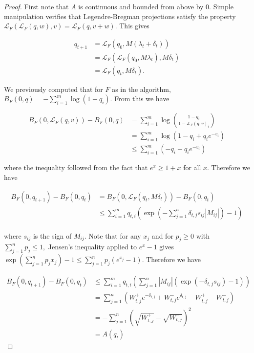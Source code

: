 \documentclass[BSc]{usydthesis}
\numberwithin{equation}{chapter}
\theoremstyle{remark}
\newcommand{\la}{\lambda}
\newcommand{\Lag}{\mathcal{L}}
\begin{document}
\begin{proof}
 First note that $A$ is continuous and bounded from above by $0.$ Simple manipulation verifies that Legendre-Bregman projections satisfy the property $\Lag_F( \Lag_F(q,w), v) = \Lag_F(q, v+w).$ This gives
 
 \begin{align*}
  q_{t+1} &= \Lag_F(q_0, M(\la_t + \delta_t)) \\
          &= \Lag_F( \Lag_F(q_0, M\la_t), M\delta_t) \\
          &= \Lag_F (q_t, M\delta_t).
 \end{align*}
 
We previously computed that for $F$ as in the algorithm, $B_F(0,q) = - \sum_{i=1}^m \log(1-q_i).$ From this we have

\begin{align*}
 B_F(0, \Lag_F(q,v) ) - B_F( 0 ,q ) &= \sum_{i=1}^m \log \left( \frac{1-q_i}{1- \Lag_F(q,v)_i} \right) \\
                                    &= \sum_{i=1}^m \log (1-q_i + q_i e^{-v_i}) \\
                                    &\leq \sum_{i=1}^m (-q_i + q_i e^{-v_i})
\end{align*}

where the inequality followed from the fact that $e^x \geq 1+x$ for all $x.$ Therefore we have 

\begin{align*}
 B_F(0,q_{t+1}) - B_F(0,q_t) &= B_F(0, \Lag_F(q_t, M\delta_t) ) - B_F(0,q_t) \\
                             &\leq \sum_{i=1}^m q_{t,i} \left( \exp \left( - \sum_{j=1}^n \delta_{t,j} s_{ij} | M_{ij}| \right) -1 \right) \\
\end{align*}

where $s_{ij}$ is the sign of $M_{ij}.$ Note that for any $x_j$ and for $p_j\geq 0$ with $\sum_{j=1}^n p_j \leq 1,$ Jensen's inequality applied to $e^x-1$ gives $\exp\left( \sum_{j=1}^n p_j x_j \right) - 1 \leq \sum_{j=1}^n p_j (e^{x_j}-1).$ Therefore we have 

\begin{align}
 B_F(0,q_{t+1}) - B_F(0,q_t) &\leq \sum_{i=1}^m q_{t,i} \left( \sum_{j=1}^n |M_{ij}| (\exp(- \delta_{t,j} s_{ij}) -1) \right) \\
                             &= \sum_{j=1}^n \left( W^+_{t,j} e^{-\delta_{t,j}} + W^-_{t,j} e^{\delta_{t,j}} - W^+_{t,j} - W^-_{t,j}\right) \label{e}\\
                             &= - \sum_{j=1}^n \left( \sqrt{ W^+_{t,j}} - \sqrt{ W^-_{t,j}}\right)^2\\
                             &= A(q_t)
\end{align}


\end{proof}
\end{document}
